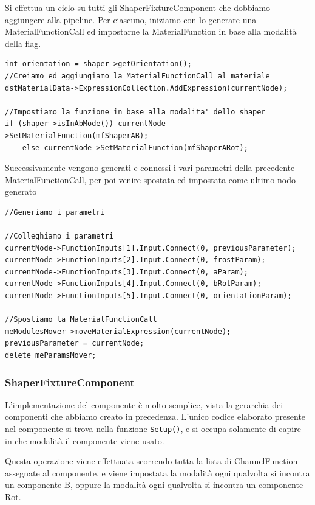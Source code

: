\documentclass[main.tex]{subfiles}
\begin{document}
Si effettua un ciclo su tutti gli ShaperFixtureComponent che dobbiamo aggiungere alla pipeline. Per ciascuno, iniziamo con lo generare una MaterialFunctionCall ed impostarne la MaterialFunction in base alla modalità della flag.
\clearpage
\begin{lstlisting}
int orientation = shaper->getOrientation();
//Creiamo ed aggiungiamo la MaterialFunctionCall al materiale
dstMaterialData->ExpressionCollection.AddExpression(currentNode);

//Impostiamo la funzione in base alla modalita' dello shaper
if (shaper->isInAbMode()) currentNode->SetMaterialFunction(mfShaperAB);
    else currentNode->SetMaterialFunction(mfShaperARot);
\end{lstlisting}
Successivamente vengono generati e connessi i vari parametri della precedente MaterialFunctionCall, per poi venire spostata ed impostata come ultimo nodo generato
\begin{lstlisting}
//Generiamo i parametri

//Colleghiamo i parametri
currentNode->FunctionInputs[1].Input.Connect(0, previousParameter);
currentNode->FunctionInputs[2].Input.Connect(0, frostParam);
currentNode->FunctionInputs[3].Input.Connect(0, aParam);
currentNode->FunctionInputs[4].Input.Connect(0, bRotParam);
currentNode->FunctionInputs[5].Input.Connect(0, orientationParam);

//Spostiamo la MaterialFunctionCall
meModulesMover->moveMaterialExpression(currentNode);
previousParameter = currentNode;
delete meParamsMover;
\end{lstlisting}

\subsubsection{ShaperFixtureComponent}\label{subsec:5_1_ShaperFixtureComponent}
L'implementazione del componente è molto semplice, vista la gerarchia dei componenti che abbiamo creato in precedenza. L'unico codice elaborato presente nel componente si trova nella funzione \lstinline{Setup()}, e si occupa solamente di capire in che modalità il componente viene usato. 

Questa operazione viene effettuata scorrendo tutta la lista di ChannelFunction assegnate al componente, e viene impostata la modalità  ogni qualvolta si incontra un componente B, oppure la modalità  ogni qualvolta si incontra un componente Rot.
%
\end{document}
